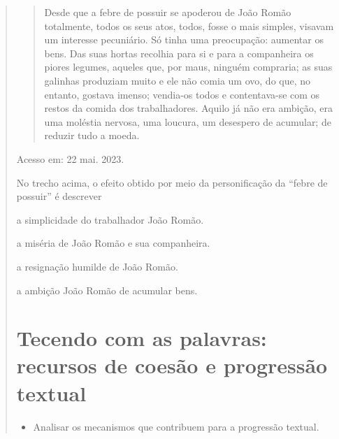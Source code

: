 \begin{quote}
{%


\begin{quote}

Desde que a febre de possuir se apoderou de João Romão totalmente, todos os seus atos, todos, 
fosse o mais simples, visavam um interesse pecuniário. Só tinha uma preocupação: aumentar 
os bens. Das suas hortas recolhia para si e para a companheira os piores legumes, aqueles que,
por maus, ninguém compraria; as suas galinhas produziam muito e ele não comia um ovo, do que, 
no entanto, gostava imenso; vendia-os todos e contentava-se com os restos da comida dos 
trabalhadores. Aquilo já não era ambição, era uma moléstia nervosa, uma loucura, um desespero
de acumular; de reduzir tudo a moeda.

\end{quote}

Acesso em: 22 mai. 2023.}

No trecho acima, o efeito obtido por meio da personificação da ``febre de possuir'' é descrever

\begin{escolha}
  
  \item a simplicidade do trabalhador João Romão. 
  
  \item a miséria de João Romão e sua companheira.
  
  \item a resignação humilde de João Romão. 
  
  \item a ambição João Romão de acumular bens. 

\end{escolha}


\chapter{Tecendo com as palavras: recursos de coesão e progressão textual}


\begin{itemize}

  \item Analisar os mecanismos que contribuem para a progressão textual.


\end{itemize}
\end{quote}
